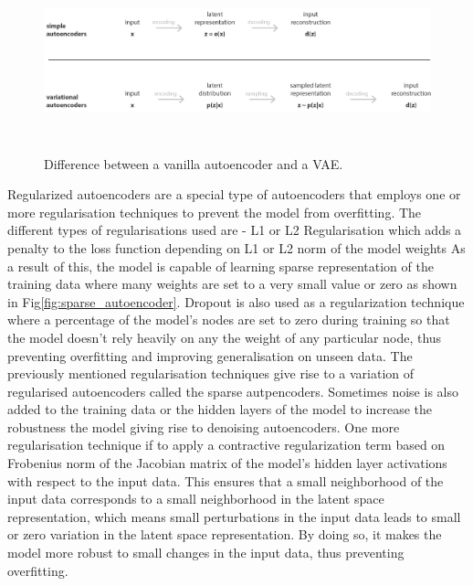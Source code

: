 \begin{figure}[t]
  \centering
  \includegraphics[width=400pt,height=150pt]{pictures/vae.png}
  \caption{Difference between a vanilla autoencoder and a \ac{VAE}.\cite{vae_image}}
  \label{fig:vae}
\end{figure} 
Regularized autoencoders are a special type of autoencoders that employs one or more regularisation techniques to prevent the model from overfitting. The different types of regularisations used are - L1 or L2 Regularisation which adds a penalty to the loss function depending on L1 or L2 norm of the model weights As a result of this, the model is capable of learning sparse representation of the training data where many weights are set to a very small value or zero as shown in Fig\ref*{fig:sparse_autoencoder}. Dropout is also used as a regularization technique where a percentage of the model's nodes are set to zero during training so that the model doesn't rely heavily on any the weight of any particular node, thus preventing overfitting and improving generalisation on unseen data. The previously mentioned regularisation techniques give rise to a variation of regularised autoencoders called the sparse autpencoders\cite*{ng2011sparse}. Sometimes noise is also added to the training data or the hidden layers of the model to increase the robustness the model giving rise to denoising autoencoders\cite*{vincent2008extracting}. One more regularisation technique if to apply a contractive regularization term based on Frobenius norm of the Jacobian matrix of the model's hidden layer activations with respect to the input data\cite*{rifai2011contractive,autoencoder}. This ensures that a small neighborhood of the input data corresponds to a small neighborhood in the latent space representation, which means small perturbations in the input data leads to small or zero variation in the latent space representation\cite*{rifai2011contractive,autoencoder}. By doing so, it makes the model more robust to small changes in the input data, thus preventing overfitting.

